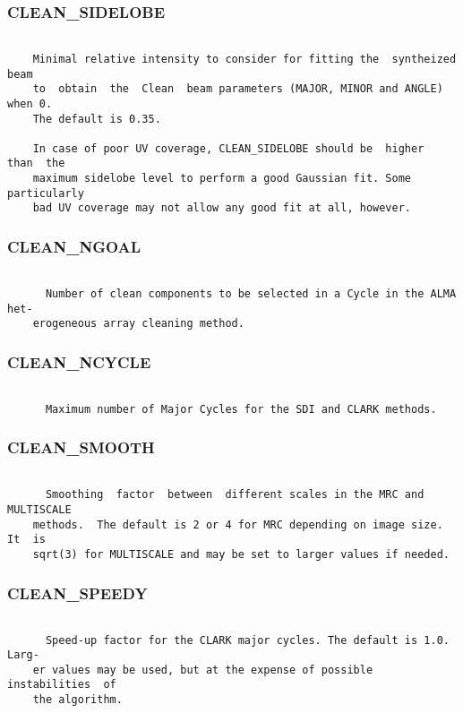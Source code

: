 \subsubsection{CLEAN\_SIDELOBE}
\begin{verbatim}

    Minimal relative intensity to consider for fitting the  syntheized  beam
    to  obtain  the  Clean  beam parameters (MAJOR, MINOR and ANGLE) when 0.
    The default is 0.35.

    In case of poor UV coverage, CLEAN_SIDELOBE should be  higher  than  the
    maximum sidelobe level to perform a good Gaussian fit. Some particularly
    bad UV coverage may not allow any good fit at all, however.

\end{verbatim}
\subsubsection{CLEAN\_NGOAL}
\begin{verbatim}

      Number of clean components to be selected in a Cycle in the ALMA  het-
    erogeneous array cleaning method.

\end{verbatim}
\subsubsection{CLEAN\_NCYCLE}
\begin{verbatim}

      Maximum number of Major Cycles for the SDI and CLARK methods.

\end{verbatim}
\subsubsection{CLEAN\_SMOOTH}
\begin{verbatim}

      Smoothing  factor  between  different scales in the MRC and MULTISCALE
    methods.  The default is 2 or 4 for MRC depending on image size.  It  is
    sqrt(3) for MULTISCALE and may be set to larger values if needed.

\end{verbatim}
\subsubsection{CLEAN\_SPEEDY}
\begin{verbatim}

      Speed-up factor for the CLARK major cycles. The default is 1.0.  Larg-
    er values may be used, but at the expense of possible  instabilities  of
    the algorithm.

\end{verbatim}
